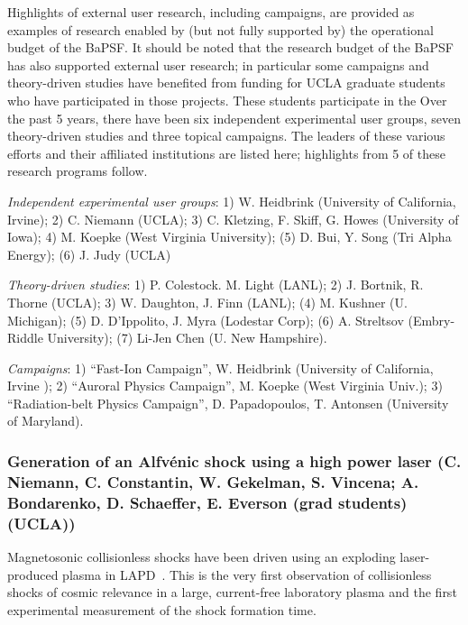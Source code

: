 \documentclass[11pt]{article}
\begin{document}
Highlights of external user research, including campaigns, are
provided as examples of research enabled by (but not fully supported
by) the operational budget of the BaPSF.  It should be noted that the
research budget of the BaPSF has also supported external user
research; in particular some campaigns and theory-driven studies have
benefited from funding for UCLA graduate students who have
participated in those projects.  These students participate in the
Over the past 5 years, there have been six independent experimental
user groups, seven theory-driven studies and three topical
campaigns. The leaders of these various efforts and their affiliated
institutions are listed here; highlights from 5 of these research
programs follow.

\begin{description}
\item{\emph{Independent experimental user groups}}: 1) W. Heidbrink
(University of California, Irvine); 2) C. Niemann (UCLA); 3) C. Kletzing, F. Skiff, G. Howes (University of Iowa); 4) M.
Koepke (West Virginia University); (5) D. Bui, Y. Song (Tri Alpha
Energy); (6) J. Judy (UCLA)

\item{\emph{Theory-driven studies}}: 1) P. Colestock. M. Light (LANL);
2) J. Bortnik, R. Thorne (UCLA); 3) W. Daughton, J. Finn (LANL); (4) M.
Kushner (U. Michigan); (5) D. D'Ippolito, J. Myra (Lodestar Corp); (6)
A. Streltsov (Embry-Riddle University); (7) Li-Jen Chen (U. New
Hampshire).

\item{\emph{Campaigns}}: 1) ``Fast-Ion Campaign'', W. Heidbrink
(University of California, Irvine ); 2) ``Auroral Physics Campaign'', M. Koepke (West Virginia Univ.); 3)
``Radiation-belt Physics Campaign'', D. Papadopoulos, T. Antonsen (University of Maryland).
\end{description}



\subsubsection{Generation of an Alfv\'{e}nic shock
using a high power laser  (C. Niemann, C. Constantin, W. Gekelman,
S. Vincena; A. Bondarenko, D. Schaeffer, E. Everson (grad students) (UCLA))}

Magnetosonic collisionless shocks have been driven using an exploding
laser-produced plasma in LAPD~\citep{schaeffer:2014,niemann:2014}. This is the very first
observation of collisionless shocks of cosmic relevance in a large,
current-free laboratory plasma and the first experimental measurement
of the shock formation time. 
\end{document}
